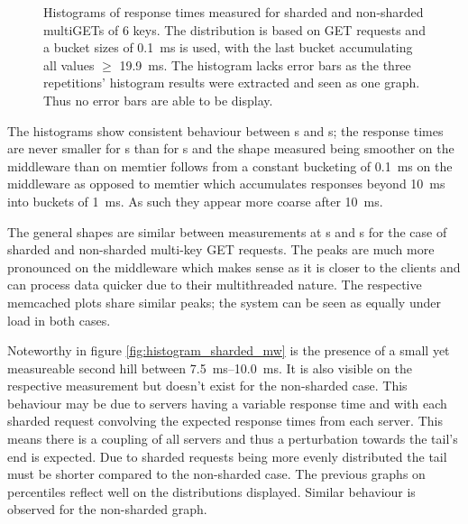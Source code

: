 \begin{figure}
\begin{subfigure}[t!]{0.48\textwidth}
            \end{subfigure}
            \caption{Histograms of response times measured for sharded and non-sharded multiGETs of 6 keys. The
                     distribution is based on GET requests and a bucket sizes of \SI{0.1}{\milli\second} is used, with the last
                     bucket accumulating all values $\geq$ \SI{19.9}{\milli\second}. The histogram lacks error bars as
                     the three repetitions' histogram results were extracted and seen as one graph. Thus no error bars
                     are able to be display.\label{fig:histograms}}
        \end{figure}

        The histograms show consistent behaviour between \srv{}s and \mw{}s; the response times are never smaller for
        \srv{}s than for \mw{}s and the shape measured being smoother on the middleware than on memtier follows from
        a constant bucketing of \SI{0.1}{\milli\second} on the middleware as opposed to memtier which accumulates
        responses beyond \SI{10}{\milli\second} into buckets of \SI{1}{\milli\second}. As such they appear more coarse
        after \SI{10}{\milli\second}.

        The general shapes are similar between measurements at \mw{}s and \cli{}s for the case of sharded and
        non-sharded multi-key GET requests. The peaks are much more pronounced on the middleware which makes sense as it
        is closer to the clients and can process data quicker due to their multithreaded nature. The respective
        memcached plots share similar peaks; the system can be seen as equally under load in both cases.

        Noteworthy in figure \ref{fig:histogram_sharded_mw} is the presence of a small yet measureable second hill
        between \SIrange{7.5}{10.0}{\milli\second}. It is also visible on the respective \cli{} measurement but doesn't
        exist for the non-sharded case. This behaviour may be due to servers having a variable response time and with
        each sharded request convolving the expected response times from each server. This means there is a coupling of
        all servers and thus a perturbation towards the tail's end is expected. Due to sharded requests being more
        evenly distributed the tail must be shorter compared to the non-sharded case. The previous graphs on percentiles
        reflect well on the distributions displayed. Similar behaviour is observed for the non-sharded graph.

